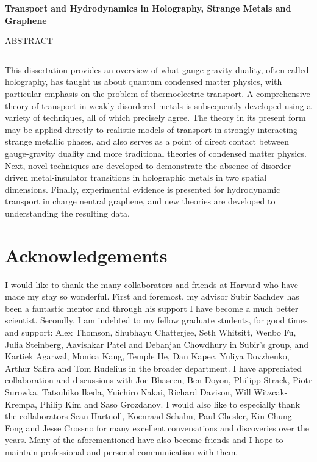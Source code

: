 \documentclass[10pt, oneside]{book}
\begin{document}
\begin{doublespace}
\vspace{0.5in}

\begin{center}
{\huge \textbf{Transport and Hydrodynamics in Holography, Strange Metals and Graphene}}


\vspace{0.5 in}

ABSTRACT

$\;$ \\

\end{center}

This dissertation provides an overview of what gauge-gravity duality, often called holography, has taught us about quantum condensed matter physics,  with particular emphasis on the problem of thermoelectric transport.   A comprehensive theory of transport in weakly disordered metals is subsequently developed using a variety of techniques, all of which precisely agree.    The theory in its present form may be applied directly to realistic models of transport in strongly interacting strange metallic phases, and also serves as a point of direct contact between gauge-gravity duality and more traditional theories of condensed matter physics.    Next, novel techniques are developed to demonstrate the absence of disorder-driven metal-insulator transitions in holographic metals in two spatial dimensions.   Finally, experimental evidence is presented for hydrodynamic transport in charge neutral graphene, and new theories are developed to understanding the resulting data.

\pagebreak




\tableofcontents




\chapter*{Acknowledgements}



I would like to thank the many collaborators and friends at Harvard who have made my stay so wonderful.   First and foremost, my advisor Subir Sachdev has been a fantastic mentor and through his support I have become a much better scientist.   Secondly, I am  indebted to my fellow graduate students, for good times and support:  Alex Thomson, Shubhayu Chatterjee, Seth Whitsitt, Wenbo Fu, Julia Steinberg, Aavishkar Patel and Debanjan Chowdhury in Subir's group,  and Kartiek Agarwal, Monica Kang, Temple He, Dan Kapec, Yuliya Dovzhenko, Arthur Safira and Tom Rudelius in the broader department.  I have appreciated collaboration and discussions with Joe Bhaseen, Ben Doyon, Philipp Strack, Piotr Surowka, Tatsuhiko Ikeda, Yuichiro Nakai, Richard Davison, Will Witzcak-Krempa, Philip Kim and Saso Grozdanov.      I would also like to especially thank the collaborators Sean Hartnoll, Koenraad Schalm, Paul Chesler, Kin Chung Fong and Jesse Crossno for many excellent conversations and discoveries over the years.   Many of the aforementioned have also become friends and I hope to maintain professional and personal communication with them.    


\end{doublespace}
\end{document}
